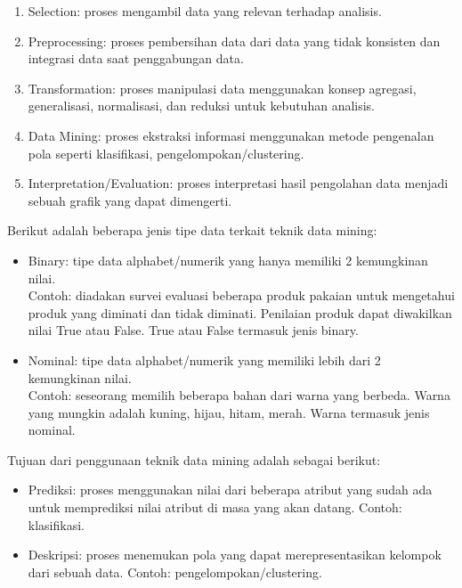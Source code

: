 \documentclass[a4paper,twoside]{article}
\begin{document}
\begin{enumerate}
\begin{enumerate}
\item Selection: proses mengambil data yang relevan terhadap analisis.
\item Preprocessing: proses pembersihan data dari data yang tidak konsisten dan integrasi data saat penggabungan data.
\item Transformation: proses manipulasi data menggunakan konsep agregasi, generalisasi, normalisasi, dan reduksi untuk kebutuhan analisis.
\item Data Mining: proses ekstraksi informasi menggunakan metode pengenalan pola seperti klasifikasi, pengelompokan/clustering.
\item Interpretation/Evaluation: proses interpretasi hasil pengolahan data menjadi sebuah grafik yang dapat dimengerti.
\end{enumerate}


\noindent Berikut adalah beberapa jenis tipe data terkait teknik data mining:

\begin{itemize}

\item Binary: tipe data alphabet/numerik yang hanya memiliki 2 kemungkinan nilai.\\
Contoh: diadakan survei evaluasi beberapa produk pakaian untuk mengetahui produk yang diminati dan tidak diminati. Penilaian produk dapat diwakilkan nilai True atau False. True atau False termasuk jenis binary.

\item Nominal: tipe data alphabet/numerik yang memiliki lebih dari 2 kemungkinan nilai.\\
Contoh: seseorang memilih beberapa bahan dari warna yang berbeda. Warna yang mungkin adalah kuning, hijau, hitam, merah. Warna termasuk jenis nominal.

\end{itemize}

\noindent Tujuan dari penggunaan teknik data mining adalah sebagai berikut:

\begin{itemize}

\item Prediksi: proses menggunakan nilai dari beberapa atribut yang sudah ada untuk memprediksi nilai atribut di masa yang akan datang. Contoh: klasifikasi.

\item Deskripsi: proses menemukan pola yang dapat merepresentasikan kelompok dari sebuah data. Contoh: pengelompokan/clustering.


\end{itemize}
\end{enumerate}
\end{document}
